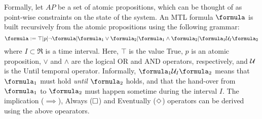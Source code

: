 Formally, let $AP$ be a set of atomic propositions, which can be thought of as point-wise constraints on the state of the system.
An MTL formula $\formula$ is built recursively from the atomic propositions using the following grammar:
\[\formula \defeq \top|p|\neg \formula | \formula_1 \lor \formula_2 | \formula_1 \land \formula_2 | \formula_1 \until_I \formula_2\]
where $I \subset \Re$ is a time interval.
Here, $\top$ is the value True, $p$ is an atomic proposition, $\lor$ and $\land$ are the logical OR and AND operators, respectively, and $\mathcal{U}$ is the Until temporal operator.
Informally, $\formula_1 \until_I \formula_2$ means that $\formula_1$ must hold \textit{until} $\formula_2$ holds, and that the hand-over from $\formula_1$  to $\formula_2$ must happen sometime during the interval $I$.
The implication ($\implies$), Always ($\square$) and Eventually ($\Diamond$) operators can be derived using the above opearators.

